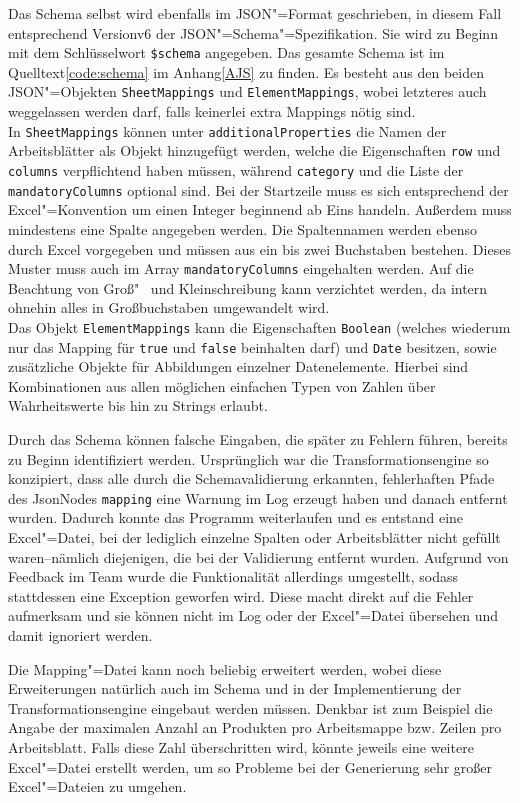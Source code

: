 Das Schema selbst wird ebenfalls im JSON"=Format geschrieben, in diesem Fall entsprechend Version\nbs v6 der JSON"=Schema"=Spezifikation. Sie wird zu Beginn mit dem Schlüsselwort \texttt{\$schema} angegeben. Das gesamte Schema ist im Quelltext\nbs\ref{code:schema} im Anhang\nbs\ref{AJS} zu finden. Es besteht aus den beiden JSON"=Objekten \texttt{SheetMappings} und \texttt{ElementMappings}, wobei letzteres auch weggelassen werden darf, falls keinerlei extra Mappings nötig sind.  \\
In \texttt{SheetMappings} können unter \texttt{additionalProperties} die Namen der Arbeitsblätter als Objekt hinzugefügt werden, welche die Eigenschaften \texttt{row} und \texttt{columns} verpflichtend haben müssen, während \texttt{category} und die Liste der \texttt{mandatoryColumns} optional sind. Bei der Startzeile muss es sich entsprechend der Excel"=Konvention um einen Integer beginnend ab Eins handeln. Außerdem muss mindestens eine Spalte angegeben werden. Die Spaltennamen werden ebenso durch Excel vorgegeben und müssen aus ein bis zwei Buchstaben bestehen. Dieses Muster muss auch im Array \texttt{mandatoryColumns} eingehalten werden. Auf die Beachtung von Groß"~ und Kleinschreibung kann verzichtet werden, da intern ohnehin alles in Großbuchstaben umgewandelt wird. \\
Das Objekt \texttt{ElementMappings} kann die Eigenschaften \texttt{Boolean} (welches wiederum nur das Mapping für \texttt{true} und \texttt{false} beinhalten darf) und \texttt{Date} besitzen, sowie zusätzliche Objekte für Abbildungen einzelner Datenelemente. Hierbei sind Kombinationen aus allen möglichen einfachen Typen von Zahlen über Wahrheitswerte bis hin zu Strings erlaubt.

Durch das Schema können falsche Eingaben, die später zu Fehlern führen, bereits zu Beginn identifiziert werden. Ursprünglich war die Transformationsengine so konzipiert, dass alle durch die Schemavalidierung erkannten, fehlerhaften Pfade des JsonNodes \texttt{mapping} eine Warnung im Log erzeugt haben und danach entfernt wurden. Dadurch konnte das Programm weiterlaufen und es entstand eine Excel"=Datei, bei der lediglich einzelne Spalten oder Arbeitsblätter nicht gefüllt waren\nbs --\nbs nämlich diejenigen, die bei der Validierung entfernt wurden. Aufgrund von Feedback im Team wurde die Funktionalität allerdings umgestellt, sodass stattdessen eine Exception geworfen wird. Diese macht direkt auf die Fehler aufmerksam und sie können nicht im Log oder der Excel"=Datei übersehen und damit ignoriert werden. 

Die Mapping"=Datei kann noch beliebig erweitert werden, wobei diese Erweiterungen natürlich auch im Schema und in der Implementierung der Transformationsengine eingebaut werden müssen. Denkbar ist zum Beispiel die Angabe der maximalen Anzahl an Produkten pro Arbeitsmappe bzw. Zeilen pro Arbeitsblatt. Falls diese Zahl überschritten wird, könnte jeweils eine weitere Excel"=Datei erstellt werden, um so Probleme bei der Generierung sehr großer Excel"=Dateien zu umgehen. 


